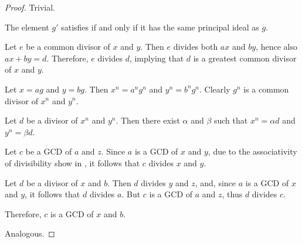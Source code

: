 \begin{proof}
   Trivial.

   The element \( g' \) satisfies  if and only if it has the same principal ideal as \( g \).

   Let \( e \) be a common divisor of \( x \) and \( y \). Then \( e \) divides both \( ax \) and \( by \), hence also \( ax + by = d \). Therefore, \( e \) divides \( d \), implying that \( d \) is a greatest common divisor of \( x \) and \( y \).

   Let \( x = ag \) and \( y = bg \). Then \( x^n = a^n g^n \) and \( y^n = b^n g^n \). Clearly \( g^n \) is a common divisor of \( x^n \) and \( y^n \).

  Let \( d \) be a divisor of \( x^n \) and \( y^n \). Then there exist \( \alpha \) and \( \beta \) such that \( x^n = \alpha d \) and \( y^n = \beta d \).


  \SufficiencySubProof* Let \( c \) be a GCD of \( a \) and \( z \). Since \( a \) is a GCD of \( x \) and \( y \), due to the associativity of divisibility show in , it follows that \( c \) divides \( x \) and \( y \).

  Let \( d \) be a divisor of \( x \) and \( b \). Then \( d \) divides \( y \) and \( z \), and, since \( a \) is a GCD of \( x \) and \( y \), it follows that \( d \) divides \( a \). But \( c \) is a GCD of \( a \) and \( z \), thus \( d \) divides \( c \).

  Therefore, \( c \) is a GCD of \( x \) and \( b \).

  \NecessitySubProof* Analogous.
\end{proof}

